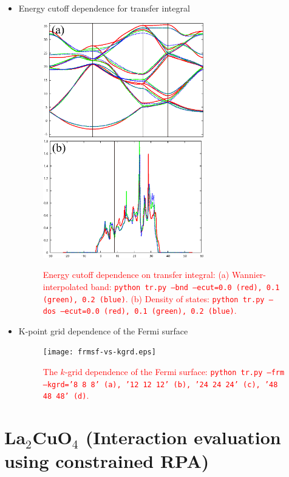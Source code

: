 \documentclass{article}
\newcommand{\tr}[1]{\textcolor{red}{#1}}
\begin{document}
\begin{itemize}
\item{Energy cutoff dependence for transfer integral}

\begin{figure}[H] 
\centering
\includegraphics[width=7cm]{band-vs-th.eps}
\includegraphics[width=7cm]{dos-vs-th.eps}
\caption{\tr{Energy cutoff dependence on transfer integral: (a) Wannier-interpolated band: \texttt{python tr.py --bnd --ecut=0.0 (red), 0.1 (green), 0.2 (blue)}. (b) Density of states: \texttt{python tr.py --dos --ecut=0.0 (red), 0.1 (green), 0.2 (blue)}.}}
\label{band-dos}
\end{figure}

\vspace{10mm}
\item{K-point grid dependence of the Fermi surface}

\begin{figure}[H] 
\centering
\texttt{[image: frmsf-vs-kgrd.eps]}
\caption{\tr{The $k$-grid dependence of the Fermi surface: \texttt{python tr.py --frm --kgrd='8 8 8' (a), '12 12 12' (b), '24 24 24' (c), '48 48 48' (d)}.}}
\label{frmsf}
\end{figure}
\end{itemize}

\clearpage 

\section{\label{La2CuO4}La$_2$CuO$_4$ (Interaction evaluation using constrained RPA)} 
\end{document}
